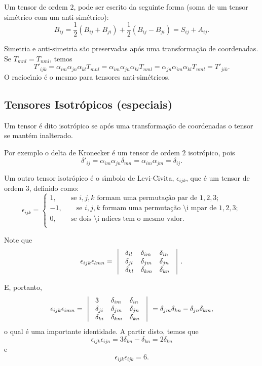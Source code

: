 Um tensor de
ordem $2$, pode ser escrito da seguinte forma (soma de um tensor
sim\'etrico com um anti-sim\'etrico):
\[B_{ij}=\frac{1}{2}(B_{ij}+B_{ji})+\frac{1}{2}(B_{ij}-B_{ji})=S_{ij}+A_{ij}.\]

Simetria e anti-simetria s\~ao preservadas ap\'os uma
transforma\c{c}\~ao de coordenadas.
 Se $T_{mnl}=T_{nml}$, temos
\[T'_{ijk}=\alpha_{im}\alpha_{jn}\alpha_{kl}T_{mnl}=\alpha_{im}\alpha_{jn}\alpha_{kl}T_{nml}=
\alpha_{jn}\alpha_{im}\alpha_{kl}T_{nml}=T'_{jik}.\] 
O racioc\'\i nio \'e o mesmo para tensores anti-sim\'etricos.

\subsection{Tensores Isotr\'opicos (especiais)}


Um tensor \'e dito isotr\'opico se ap\'os uma transforma\c{c}\~ao
de coordenadas o tensor se mant\'em inalterado.

Por exemplo o delta de Kronecker \'e um tensor de ordem $2$
isotr\'opico, pois
\[\delta'_{ij}=\alpha_{im}\alpha_{jn}\delta_{mn}=\alpha_{im}\alpha_{jm}=\delta_{ij}.\]

Um outro tensor isotr\'opico \'e o s\'\i mbolo de Levi-Civita,
$\epsilon_{ijk}$, que \'e um tensor de ordem $3$, definido como:
\[\epsilon_{ijk}=\left\{ \begin{array}{l}
           1,\mbox{   }\mbox{   }\mbox{   }\mbox{se $i,j,k$ formam uma
permuta\c{c}\~ao par de $1,2,3$};\\
          -1,\mbox{   }\mbox{   }\mbox{   }\mbox{se $i,j,k$ formam uma
permuta\c{c}\~ao \'\i mpar de $1,2,3$};\\
           0,\mbox{   }\mbox{   }\mbox{   }\mbox{se dois \'\i ndices tem o mesmo
valor}.\\
\end{array} \right.\]

Note que
\[\epsilon_{ijk}\epsilon_{lmn}= \begin{array}{lllll}
                \vline & \delta_{il} & \delta_{im} & \delta_{in} & \vline\\
                \vline &\delta_{jl} & \delta_{jm} & \delta_{jn} &\vline\\
                 \vline &\delta_{kl} & \delta_{km} & \delta_{kn} &\vline\\
\end{array}.\]

E, portanto,
\[\epsilon_{ijk}\epsilon_{imn}= \begin{array}{lllll}
                \vline & 3 & \delta_{im} & \delta_{in}&\vline \\
                \vline & \delta_{ji} & \delta_{jm} & \delta_{jn}& \vline\\
               \vline & \delta_{ki} & \delta_{km} & \delta_{kn}& \vline\\
\end{array}=\delta_{jm}\delta_{kn}-\delta_{jn}\delta_{km},\]
o qual \'e uma importante identidade. A partir disto, temos que
\[\epsilon_{ijk}\epsilon_{ijn}=3\delta_{kn}-\delta_{kn}=2\delta_{kn}\]
e
\[\epsilon_{ijk}\epsilon_{ijk}=6.\]

